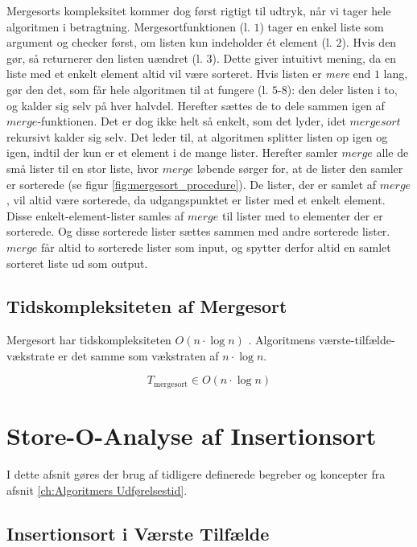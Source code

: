 Mergesorts kompleksitet kommer dog først rigtigt til udtryk, når vi tager hele algoritmen i betragtning. Mergesortfunktionen (l. $1$) tager en enkel liste som argument og checker først, om listen kun indeholder ét element (l. $2$). Hvis den gør, så returnerer den listen uændret (l. $3$). Dette giver intuitivt mening, da en liste med et enkelt element altid vil være sorteret. Hvis listen er \emph{mere} end $1$ lang, gør den det, som får hele algoritmen til at fungere (l. $5$-$8$): den deler listen i to, og kalder sig selv på hver halvdel. Herefter sættes de to dele sammen igen af $merge$-funktionen. Det er dog ikke helt så enkelt, som det lyder, idet $mergesort$ rekursivt kalder sig selv. Det leder til, at algoritmen splitter listen op igen og igen, indtil der kun er et element i de mange lister. Herefter samler $merge$ alle de små lister til en stor liste, hvor $merge$ løbende sørger for, at de lister den samler er sorterede (se figur \ref{fig:mergesort_procedure}). De lister, der er samlet af $merge$, vil altid være sorterede, da udgangspunktet er lister med et enkelt element. Disse enkelt-element-lister samles af $merge$ til lister med to elementer der er sorterede. Og disse sorterede lister sættes sammen med andre sorterede lister. $merge$ får altid to sorterede lister som input, og spytter derfor altid en samlet sorteret liste ud som output.





\subsection{Tidskompleksiteten af Mergesort}
\label{sec:Tidskompleksiteten af Mergesort}

Mergesort har tidskompleksiteten $O(n \cdot \log n)$ \cite{big-o-cheatsheet}. Algoritmens værste-tilfælde-vækstrate er det samme som vækstraten af $n \cdot \log n$.

$$T_{\text{mergesort}} \in O(n \cdot \log n)$$


\section{Store-O-Analyse af Insertionsort}
\label{sec:Analyse af Insertionsort}

I dette afsnit gøres der brug af tidligere definerede begreber og koncepter fra afsnit \ref{ch:Algoritmers Udførelsestid}.

\subsection{Insertionsort i Værste Tilfælde}%
\label{sub:Insertionsort i Værste Tilfælde}


